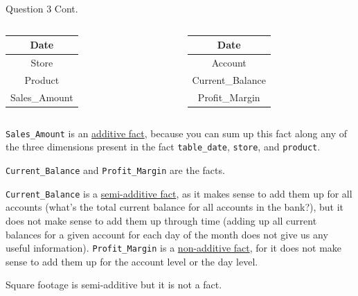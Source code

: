 \begin{frame}[fragile]{Question 3 Cont.}
\vspace{-13pt}
\begin{columns}
\begin{table}[]
	\begin{tabular}{|c|}
		\hline
		Date          \\ \hline
		Store         \\ \hline
		Product       \\ \hline
		Sales\_Amount \\ \hline
	\end{tabular}
\end{table}
\begin{table}[]
	\begin{tabular}{|c|}
		\hline
		Date          \\ \hline
		Account         \\ \hline
		Current\_Balance     \\ \hline
		Profit\_Margin \\ \hline
	\end{tabular}
\end{table}
\end{columns}
\texttt{Sales\_Amount} is an \underline{additive fact}, because you can sum up this fact along any of the three dimensions present in the fact \texttt{table\_date}, \texttt{store}, and \texttt{product}.\\\vspace{3pt}

\texttt{Current\_Balance} and \texttt{Profit\_Margin} are the facts.\\\vspace{3pt}

\texttt{Current\_Balance} is a \underline{semi-additive fact}, as it
makes sense to add them up for all accounts (what's the total current balance for all accounts in the bank?), but it does not make sense to add them up through time (adding up all current balances for a given account for each day of the month does not give us any useful information). \texttt{Profit\_Margin} is a \underline{non-additive fact}, for it does not make sense to add them up for the account level or the day level.\\\vspace{3pt}

Square footage is semi-additive but it is not a fact.
\end{frame}

